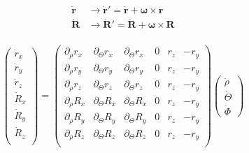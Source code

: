 \documentclass{article}
\begin{document}
\begin{subequations}
\begin{align*}
	\dot{\bm{r}} &\longrightarrow \dot{\bm{r}}' = \dot{\bm{r}} + \bm{\omega} \times \bm{r}\\
	\dot{\bm{R}}& \longrightarrow \dot{\bm{R}}' = \dot{\bm{R}} + \bm{\omega} \times \bm{R}\\
\end{align*}   
\end{subequations} 

\begin{equation}
\begin{pmatrix}
       \dot{r}_x \\
       \dot{r}_y \\
       \dot{r}_z \\
       \dot{R}_x \\
       \dot{R}_y \\
       \dot{R}_z\\
     \end{pmatrix} = \begin{pmatrix}
       \partial_{\rho} r_x & \partial_{\Theta} r_x & \partial_{\Theta} r_x & 0 & r_z & -r_y\\
       \partial_{\rho} r_y & \partial_{\Theta} r_y & \partial_{\Theta} r_y & 0 & r_z & -r_y\\
       \partial_{\rho} r_z & \partial_{\Theta} r_z & \partial_{\Theta} r_z & 0 & r_z & -r_y\\
       \partial_{\rho} R_x & \partial_{\Theta} R_x & \partial_{\Theta} R_x & 0 & r_z & -r_y\\
       \partial_{\rho} R_y & \partial_{\Theta} R_y & \partial_{\Theta} R_y & 0 & r_z & -r_y\\
       \partial_{\rho} R_z & \partial_{\Theta} R_z & \partial_{\Theta} R_z & 0 & r_z & -r_y\\
     \end{pmatrix}
     \begin{pmatrix}
     \dot{\rho}\\
     \dot{\Theta}\\
     \dot{\Phi}
     \end{pmatrix}
     \end{equation}
     
\end{document}
